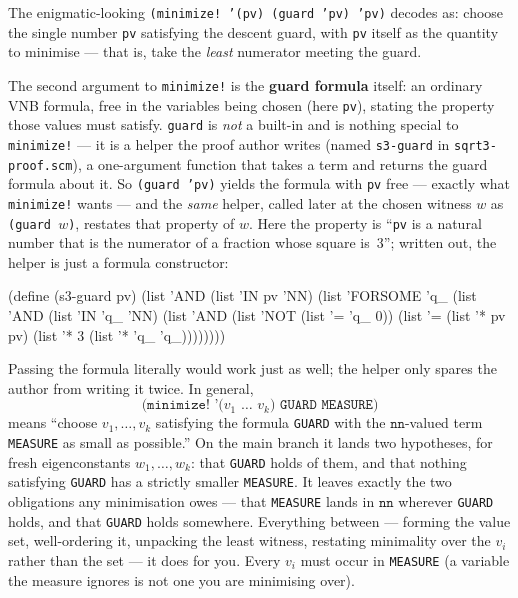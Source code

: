 \begin{remark}
\label{remark:minimize}
The enigmatic-looking \texttt{(minimize! '(pv) (guard 'pv) 'pv)} decodes as:
choose the single number \texttt{pv} satisfying the descent guard, with
\texttt{pv} itself as the quantity to minimise --- that is, take the
\emph{least} numerator meeting the guard.

The second argument to \texttt{minimize!} is the \textbf{guard formula} itself:
an ordinary VNB formula, free in the variables being chosen (here \texttt{pv}),
stating the property those values must satisfy.  \texttt{guard} is \emph{not} a
built-in and is nothing special to \texttt{minimize!} --- it is a helper the
proof author writes (named \texttt{s3-guard} in \texttt{sqrt3-proof.scm}), a
one-argument function that takes a term and returns the guard formula about it.
So \texttt{(guard 'pv)} yields the formula with \texttt{pv} free --- exactly what
\texttt{minimize!} wants --- and the \emph{same} helper, called later at the
chosen witness $w$ as \texttt{(guard $w$)}, restates that property of $w$.  Here
the property is ``\texttt{pv} is a natural number that is the numerator of a
fraction whose square is~$3$''; written out, the helper is just a formula
constructor:

\begin{VNBcode}
(define (s3-guard pv)
  (list 'AND (list 'IN pv 'NN)
        (list 'FORSOME 'q_
          (list 'AND (list 'IN 'q_ 'NN)
                (list 'AND (list 'NOT (list '= 'q_ 0))
                      (list '= (list '* pv pv) (list '* 3 (list '* 'q_ 'q_))))))))
\end{VNBcode}

Passing the formula literally would work just as well; the helper only spares the
author from writing it twice.  In general,
\[
  \texttt{(minimize! '($v_1$ \ldots\ $v_k$) GUARD MEASURE)}
\]
means ``choose $v_1,\ldots,v_k$ satisfying the formula \texttt{GUARD} with the
$\mathtt{nn}$-valued term \texttt{MEASURE} as small as possible.''  On the main
branch it lands two hypotheses, for fresh eigenconstants $w_1,\ldots,w_k$: that
\texttt{GUARD} holds of them, and that nothing satisfying \texttt{GUARD} has a
strictly smaller \texttt{MEASURE}.  It leaves exactly the two obligations any
minimisation owes --- that \texttt{MEASURE} lands in $\mathtt{nn}$ wherever
\texttt{GUARD} holds, and that \texttt{GUARD} holds somewhere.  Everything
between --- forming the value set, well-ordering it, unpacking the least
witness, restating minimality over the $v_i$ rather than the set --- it does for
you.  Every $v_i$ must occur in \texttt{MEASURE} (a variable the measure ignores
is not one you are minimising over).


\end{remark}
